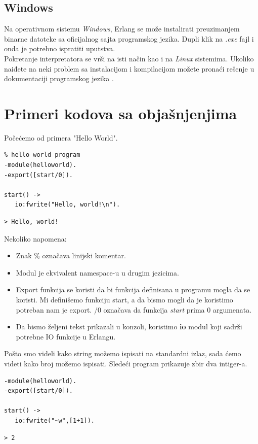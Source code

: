 \documentclass[a4paper]{article}
\begin{document}
{\subsection{Windows}
\label{subsec:instalacijaWindows}
Na operativnom sistemu {\em Windows}, Erlang se može instalirati preuzimanjem binarne datoteke sa oficijalnog sajta programskog jezika. Dupli klik na {\em .exe} fajl i onda je potrebno ispratiti uputstva. \\

Pokretanje interpretatora se vrši na isti način kao i na {\em Linux} sistemima. Ukoliko naiđete na neki problem sa instalacijom i kompilacijom možete pronaći rešenje u dokumentaciji programskog jezika \cite{sajt}.

\section{Primeri kodova sa objašnjenjima}
\label{sec:primeri}
Počećemo od primera "Hello World".  
\begin{verbatim}
% hello world program
-module(helloworld). 
-export([start/0]). 

start() -> 
   io:fwrite("Hello, world!\n").
\end{verbatim}
\begin{verbatim}
> Hello, world!
\end{verbatim}

Nekoliko napomena:
\begin{itemize}
  \item Znak \% označava linijski komentar.
  \item Modul je ekvivalent namespace-u u drugim jezicima.
  \item Export funkcija se koristi da bi funkcija definisana u programu mogla da se koristi. Mi definišemo funkciju start, a da bismo mogli da je koristimo potreban nam je export. /0 označava da funkcija \textit{start} prima 0 argumenata.
  \item Da bismo željeni tekst prikazali u konzoli, koristimo \textbf{io} modul koji sadrži potrebne IO funkcije u Erlangu.
\end{itemize}

Pošto smo videli kako string možemo ispisati na standardni izlaz, sada ćemo videti kako broj možemo ispisati. Sledeći program prikazuje zbir dva intiger-a.

\begin{verbatim}
-module(helloworld).
-export([start/0]).

start() ->
   io:fwrite("~w",[1+1]).
\end{verbatim}
\begin{verbatim}
> 2
\end{verbatim}

}
\end{document}
